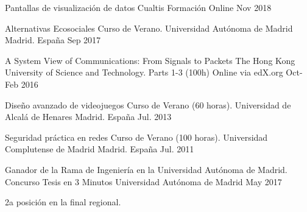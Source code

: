 \begin{cvhonors}
   \cvhonor
	{Pantallas de visualización de datos} %
	{Cualtis Formación}
	{Online} %
	{Nov 2018} %

   \cvhonor
	{Alternativas Ecosociales} %
	{Curso de Verano. Universidad Autónoma de Madrid}
	{Madrid. España} %
	{Sep 2017} %

	\cvhonor
	{A System View of Communications: From Signals to Packets} %
	{The Hong Kong University of Science and Technology. Parts 1-3 (100h)}
	{Online via edX.org} %
	{Oct-Feb 2016} %
	
	\cvhonor
	{Diseño avanzado de videojuegos} %
	{Curso de Verano (60 horas). Universidad de Alcalá de Henares}
	{Madrid. España} %
	{Jul. 2013} %
	
	\cvhonor
	{Seguridad práctica en redes} %
	{Curso de Verano (100 horas). Universidad Complutense de Madrid}
	{Madrid. España} %
	{Jul. 2011} %
\end{cvhonors}

\begin{cventries}
  \cventry
    {Ganador de la Rama de Ingeniería en la Universidad Autónoma de Madrid.} %
    {Concurso Tesis en 3 Minutos} %
    {Universidad Autónoma de Madrid} %
    {May 2017} %
    {
      \begin{cvitems} %
        \item {2a posición en la final regional.}
      \end{cvitems}
    }
\end{cventries}